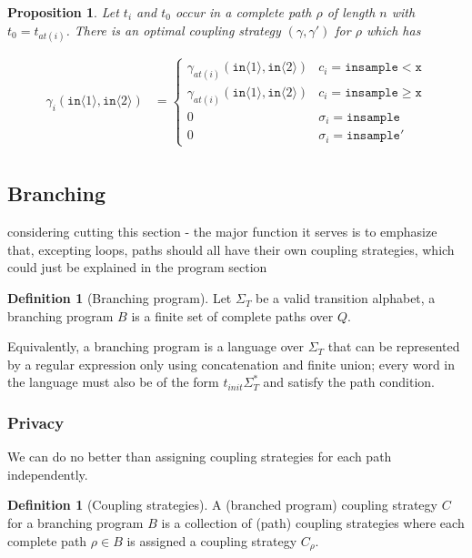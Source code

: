\documentclass[12pt]{article}
\newcommand{\gguard}[1][x]{\texttt{insample}\geq #1}
\newcommand{\lguard}[1][x]{\texttt{insample} < #1}
\newcommand{\brangle}[1]{\langle #1 \rangle}
\newtheorem{prop}[thm]{Proposition}
\theoremstyle{definition}
\newtheorem{defn}[thm]{Definition}
\begin{document}
\begin{prop}
    Let $t_i$ and $t_0$ occur in a complete path $\rho$ of length $n$ with $t_0 = t_{at(i)}$. There is an optimal coupling strategy $(\gamma, \gamma')$ for $\rho$ which has 

    \begin{align*}
        \gamma_i(\texttt{in}\brangle{1}, \texttt{in}\brangle{2}) &= \begin{cases}
            \gamma_{at(i)}(\texttt{in}\brangle{1}, \texttt{in}\brangle{2}) & c_i = \lguard[\texttt{x}]\\
            \gamma_{at(i)}(\texttt{in}\brangle{1}, \texttt{in}\brangle{2}) & c_i = \gguard[\texttt{x}]\\
            0 & \sigma_i = \texttt{insample}\\
            0 & \sigma_i = \texttt{insample}'
        \end{cases}\\
    \end{align*}
\end{prop}
 

\subsection{Branching} 
{\color{red} considering cutting this section - the major function it serves is to emphasize that, excepting loops, paths should all have their own coupling strategies, which could just be explained in the program section}


\begin{defn}[Branching program]
    Let $\Sigma_T$ be a valid transition alphabet, a branching program $B$ is a finite set of complete paths over $Q$.
\end{defn}

Equivalently, a branching program is a language over $\Sigma_T$ that can be represented by a regular expression only using concatenation and finite union; every word in the language must also be of the form $t_{init}\Sigma_T^*$ and satisfy the path condition. 

\subsubsection{Privacy}

We can do no better than assigning coupling strategies for each path independently. 
\begin{defn}[Coupling strategies]
    A (branched program) coupling strategy $C$ for a branching program $B$ is a collection of (path) coupling strategies where each complete path $\rho\in B$ is assigned a coupling strategy $C_\rho$. 
\end{defn}
\end{document}
